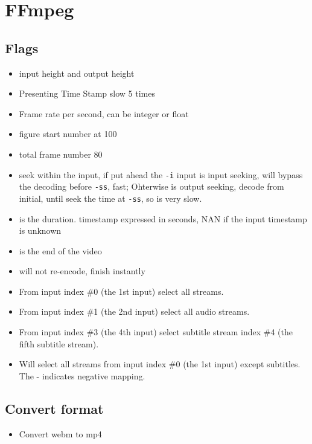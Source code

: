 \chapter{FFmpeg}

\section{Flags}
\begin{itemize}
\item {} input height and output height
\item {} Presenting Time Stamp slow 5 times
\item {} Frame rate per second, can be integer or float
\item {} figure start number at 100
\item {} total frame number 80
\item {} seek within the input, if put ahead the \verb|-i| input is input seeking, will bypass the decoding before \verb|-ss|, fast; Ohterwise is output seeking, decode from initial, until seek the time at \verb|-ss|, so is very slow.
\item {} is the duration. timestamp expressed in seconds, NAN if the input timestamp is unknown
\item {} is the end of the video
\item {} will not re-encode, finish instantly
\item {} From input index \#0 (the 1st input) select all streams.
\item {} From input index \#1 (the 2nd input) select all audio streams.
\item {} From input index \#3 (the 4th input) select subtitle stream index \#4 (the fifth subtitle stream).
\item {} Will select all streams from input index \#0 (the 1st input) except subtitles. The - indicates negative mapping.
\end{itemize}

\section{Convert format}

\begin{itemize}
\item {} Convert webm to mp4
\end{itemize}

